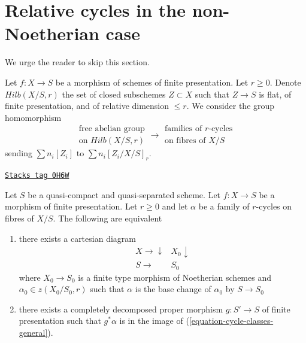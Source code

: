\section{Relative cycles in the non-Noetherian case}
\label{relative-cycles-section-non-noetherian}
We urge the reader to skip this section.

\medskip\noindent
Let $f : X \to S$ be a morphism of schemes of finite presentation.
Let $r \geq 0$. Denote $Hilb(X/S, r)$ the set of closed subschemes
$Z \subset X$ such that $Z \to S$ is flat, of finite presentation,
and of relative dimension $\leq r$. We consider the group homomorphism
\begin{equation}
\label{equation-cycle-classes-general}
\begin{matrix}
\text{free abelian group} \\
\text{on }Hilb(X/S, r)
\end{matrix}
\longrightarrow
\begin{matrix}
\text{families of }r\text{-cycles}\\
\text{on fibres of }X/S
\end{matrix}
\end{equation}
sending $\sum n_i[Z_i]$ to $\sum n_i[Z_i/X/S]_r$.

\begin{lemma}
\label{relative-cycles-lemma-relative-r-cycle-general}
\href{https://stacks.math.columbia.edu/tag/0H6W}{\texttt{Stacks tag 0H6W}}

Let $S$ be a quasi-compact and quasi-separated scheme.
Let $f : X \to S$ be a morphism of finite presentation.
Let $r \geq 0$ and let $\alpha$ be a family of $r$-cycles on fibres of $X/S$.
The following are equivalent
\begin{enumerate}
\item there exists a cartesian diagram
$$
\begin{array}{cc}X \longrightarrow\downarrow & X_0 \downarrow \\ S \longrightarrow & S_0\end{array}
$$
where $X_0 \to S_0$ is a finite type morphism of Noetherian schemes
and $\alpha_0 \in z(X_0/S_0, r)$ such that $\alpha$ is the base change
of $\alpha_0$ by $S \to S_0$
\item there exists a completely decomposed proper morphism $g : S' \to S$
of finite presentation such that $g^*\alpha$ is in the image of
(\ref{equation-cycle-classes-general}).
\end{enumerate}
\end{lemma}

